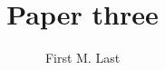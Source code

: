 \documentclass[11pt, titlepage]{article}
\title{Paper three}
\author{First M. Last}
\date{2018
  \vfill
  \singlespacing
  \begin{center}
    Working draft. \\
    Please do not cite or distribute.
  \end{center}
\vfill}
\begin{document}
\maketitle

\begin{abstract}
 \lipsum[1]
\end{abstract}

\clearpage

\lipsum[2-50]

\end{document}
